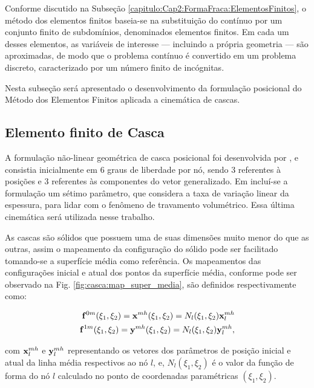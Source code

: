 \documentclass[tese_patricia]{subfiles}
\begin{document}
Conforme discutido na Subseção \ref{capitulo:Cap2:FormaFraca:ElementosFinitos}, o método dos elementos finitos baseia-se na substituição do contínuo por um conjunto finito de subdomínios, denominados elementos finitos. Em cada um desses elementos, as variáveis de interesse — incluindo a própria geometria — são aproximadas, de modo que o problema contínuo é convertido em um problema discreto, caracterizado por um número finito de incógnitas.

Nesta subseção será apresentado o desenvolvimento da formulação posicional do Método dos Elementos Finitos aplicada a cinemática de cascas.

\subsection{Elemento finito de Casca}

A formulação não-linear geométrica de casca posicional foi desenvolvida por , e consistia inicialmente em 6 graus de liberdade por nó, sendo 3 referentes à posições e 3 referentes às componentes do vetor generalizado. Em  incluí-se a formulação um sétimo parâmetro, que considera a taxa de variação linear da espessura, para lidar com o fenômeno de travamento volumétrico. Essa última cinemática será utilizada nesse trabalho.

As cascas são sólidos que possuem uma de suas dimensões muito menor do que as outras, assim o mapeamento da configuração do sólido pode ser facilitado tomando-se a superfície média como referência. Os mapeamentos das configurações inicial e atual dos pontos da superfície média, conforme pode ser observado na Fig. \ref{fig:casca:map_super_media}, são definidos respectivamente como:

\begin{align}
\mathbf{f}^{0m}(\xi_{1},\xi_{2}) = \mathbf{x}^{mh}(\xi_{1},\xi_{2}) = N_{l} (\xi_{1},\xi_{2}) \mathbf{x}_{l}^{mh}\label{eq:casca_Lposition_m}\\
\mathbf{f}^{1m}(\xi_{1},\xi_{2}) = \mathbf{y}^{mh}(\xi_{1},\xi_{2}) = N_{l} (\xi_{1},\xi_{2}) \mathbf{y}_{l}^{mh}, \label{eq:casca_Eposition_m}
\end{align}

\noindent com $\mathbf{x}_{l}^{mh}$ e $\mathbf{y}_{l}^{mh}$ representando os vetores dos parâmetros de posição inicial e atual da linha média respectivos ao nó $l$, e, $N_{l} (\xi_{1},\xi_{2})$ é o valor da função de forma do nó $l$ calculado no ponto de coordenadas paramétricas $(\xi_{1},\xi_{2})$.
\end{document}
